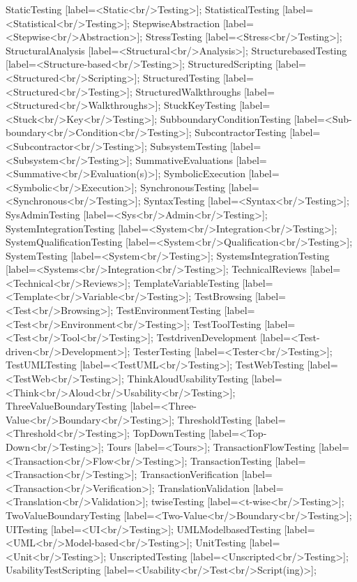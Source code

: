 \documentclass{article}
\begin{document}
{StaticTesting [label=<Static<br/>Testing>];
StatisticalTesting [label=<Statistical<br/>Testing>];
StepwiseAbstraction [label=<Stepwise<br/>Abstraction>];
StressTesting [label=<Stress<br/>Testing>];
StructuralAnalysis [label=<Structural<br/>Analysis>];
StructurebasedTesting [label=<Structure-based<br/>Testing>];
StructuredScripting [label=<Structured<br/>Scripting>];
StructuredTesting [label=<Structured<br/>Testing>];
StructuredWalkthroughs [label=<Structured<br/>Walkthroughs>];
StuckKeyTesting [label=<Stuck<br/>Key<br/>Testing>];
SubboundaryConditionTesting [label=<Sub-boundary<br/>Condition<br/>Testing>];
SubcontractorTesting [label=<Subcontractor<br/>Testing>];
SubsystemTesting [label=<Subsystem<br/>Testing>];
SummativeEvaluations [label=<Summative<br/>Evaluation(s)>];
SymbolicExecution [label=<Symbolic<br/>Execution>];
SynchronousTesting [label=<Synchronous<br/>Testing>];
SyntaxTesting [label=<Syntax<br/>Testing>];
SysAdminTesting [label=<Sys<br/>Admin<br/>Testing>];
SystemIntegrationTesting [label=<System<br/>Integration<br/>Testing>];
SystemQualificationTesting [label=<System<br/>Qualification<br/>Testing>];
SystemTesting [label=<System<br/>Testing>];
SystemsIntegrationTesting [label=<Systems<br/>Integration<br/>Testing>];
TechnicalReviews [label=<Technical<br/>Reviews>];
TemplateVariableTesting [label=<Template<br/>Variable<br/>Testing>];
TestBrowsing [label=<Test<br/>Browsing>];
TestEnvironmentTesting [label=<Test<br/>Environment<br/>Testing>];
TestToolTesting [label=<Test<br/>Tool<br/>Testing>];
TestdrivenDevelopment [label=<Test-driven<br/>Development>];
TesterTesting [label=<Tester<br/>Testing>];
TestUMLTesting [label=<TestUML<br/>Testing>];
TestWebTesting [label=<TestWeb<br/>Testing>];
ThinkAloudUsabilityTesting [label=<Think<br/>Aloud<br/>Usability<br/>Testing>];
ThreeValueBoundaryTesting [label=<Three-Value<br/>Boundary<br/>Testing>];
ThresholdTesting [label=<Threshold<br/>Testing>];
TopDownTesting [label=<Top-Down<br/>Testing>];
Tours [label=<Tours>];
TransactionFlowTesting [label=<Transaction<br/>Flow<br/>Testing>];
TransactionTesting [label=<Transaction<br/>Testing>];
TransactionVerification [label=<Transaction<br/>Verification>];
TranslationValidation [label=<Translation<br/>Validation>];
twiseTesting [label=<t-wise<br/>Testing>];
TwoValueBoundaryTesting [label=<Two-Value<br/>Boundary<br/>Testing>];
UITesting [label=<UI<br/>Testing>];
UMLModelbasedTesting [label=<UML<br/>Model-based<br/>Testing>];
UnitTesting [label=<Unit<br/>Testing>];
UnscriptedTesting [label=<Unscripted<br/>Testing>];
UsabilityTestScripting [label=<Usability<br/>Test<br/>Script(ing)>];
}
\end{document}
